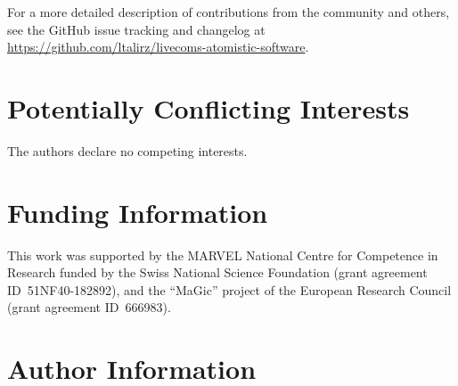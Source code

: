 \documentclass[9pt,review]{livecoms}
\newcommand{\githubrepository}{\url{https://github.com/ltalirz/livecoms-atomistic-software}}  %
\begin{document}
For a more detailed description of contributions from the community and others, see the GitHub issue tracking and changelog at \githubrepository.

\section{Potentially Conflicting Interests}
The authors declare no competing interests.

\section{Funding Information}
This work was supported by the MARVEL National Centre for Competence in Research funded by the Swiss National Science Foundation (grant agreement ID~51NF40-182892), 
and the ``MaGic'' project of the European Research Council (grant agreement ID~666983).

\section*{Author Information}
\makeorcid

\printbibliography


\end{document}
